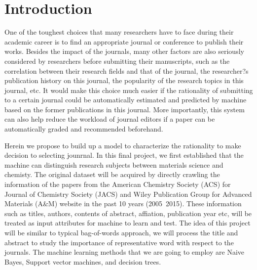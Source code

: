 \documentclass[conference]{IEEEtran}
\begin{document}





%



\section{Introduction}
One of the toughest choices that many researchers have to face during their academic career is to find an appropriate journal or conference to publish their works. Besides the impact of the journals, many other factors are also seriously considered by researchers before submitting their manuscripts, such as the correlation between their research fields and that of the journal, the researcher?s publication history on this journal, the popularity of the research topics in this journal, etc. It would make this choice much easier if the rationality of submitting to a certain journal could be automatically estimated and predicted by machine based on the former publications in this journal. More importantly, this system can also help reduce the workload of journal editors if a paper can be automatically graded and recommended beforehand.

Herein we propose to build up a model to characterize the rationality to make decision to selecting jounrnal. In this final project, we first established that the machine can distinguish research subjects between materials science and chemisty. The original dataset will be acquired by directly crawling the information of the papers from the American Chemistry Society (ACS) for Journal of Chemistry Society (JACS) and Wiley Publication Group for Advanced Materials (A\&M) website in the past 10 years (2005~2015). These information such as titles, authors, contents of abstract, affiation, publication year etc, will be treated as input attributes for machine to learn and test. The idea of this project will be similar to typical bag-of-words approach, we will process the title and abstract to study the importance of representative word with respect to the journals. The machine learning methods that we are going to employ are Naive Bayes, Support vector machines, and decision trees.
\end{document}
